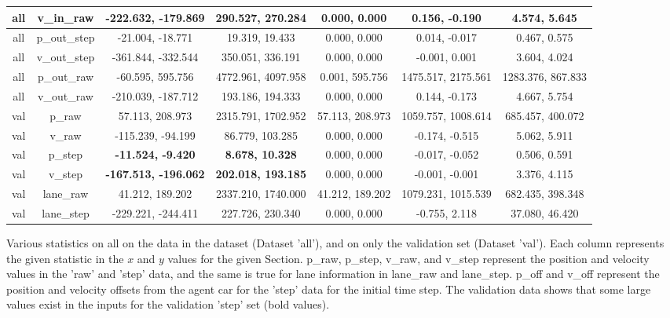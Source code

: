 \documentclass{article}
\newenvironment{changemargin}[2]{%
\begin{list}{}{%
\setlength{\topsep}{0pt}%
\setlength{\leftmargin}{#1}%
\setlength{\rightmargin}{#2}%
\setlength{\listparindent}{\parindent}%
\setlength{\itemindent}{\parindent}%
\setlength{\parsep}{\parskip}%
}%
\item[]}{\end{list}}
\begin{document}
\begin{changemargin}{-4.5cm}{-1cm}
\begin{minipage}{\linewidth}
\begin{tabular}{|c|c|c|c|c|c|c| }
all & v\_in\_raw & -222.632, -179.869 & 290.527, 270.284 & 0.000, 0.000 & 0.156, -0.190 & 4.574, 5.645\\\hline
all & p\_out\_step & -21.004, -18.771 & 19.319, 19.433 & 0.000, 0.000 & 0.014, -0.017 & 0.467, 0.575\\\hline
all & v\_out\_step & -361.844, -332.544 & 350.051, 336.191 & 0.000, 0.000 & -0.001, 0.001 & 3.604, 4.024\\\hline
all & p\_out\_raw & -60.595, 595.756 & 4772.961, 4097.958 & 0.001, 595.756 & 1475.517, 2175.561 & 1283.376, 867.833\\\hline
all & v\_out\_raw & -210.039, -187.712 & 193.186, 194.333 & 0.000, 0.000 & 0.144, -0.173 & 4.667, 5.754\\\hline
val & p\_raw & 57.113, 208.973 & 2315.791, 1702.952 & 57.113, 208.973 & 1059.757, 1008.614 & 685.457, 400.072\\\hline
val & v\_raw & -115.239, -94.199 & 86.779, 103.285 & 0.000, 0.000 & -0.174, -0.515 & 5.062, 5.911\\\hline
val & p\_step & \bf -11.524, \bf -9.420 & \bf 8.678, \bf 10.328 & 0.000, 0.000 & -0.017, -0.052 & 0.506, 0.591\\\hline
val & v\_step & \bf -167.513, \bf -196.062 & \bf 202.018, \bf 193.185 & 0.000, 0.000 & -0.001, -0.001 & 3.376, 4.115\\\hline
val & lane\_raw & 41.212, 189.202 & 2337.210, 1740.000 & 41.212, 189.202 & 1079.231, 1015.539 & 682.435, 398.348\\\hline
val & lane\_step & -229.221, -244.411 & 227.726, 230.340 & 0.000, 0.000 & -0.755, 2.118 & 37.080, 46.420\\\hline
\bottomrule[1.25pt]
\end {tabular}\par
\bigskip
Various statistics on all on the data in the dataset (Dataset 'all'), and on only the validation set (Dataset 'val'). Each column represents the given statistic in the $x$ and $y$ values for the given Section. p\_raw, p\_step, v\_raw, and v\_step represent the position and velocity values in the 'raw' and 'step' data, and the same is true for lane information in lane\_raw and lane\_step. p\_off and v\_off represent the position and velocity offsets from the agent car for the 'step' data for the initial time step. The validation data shows that some large values exist in the inputs for the validation 'step' set (bold values). 
\end{minipage}
\end{changemargin}
\end{document}
